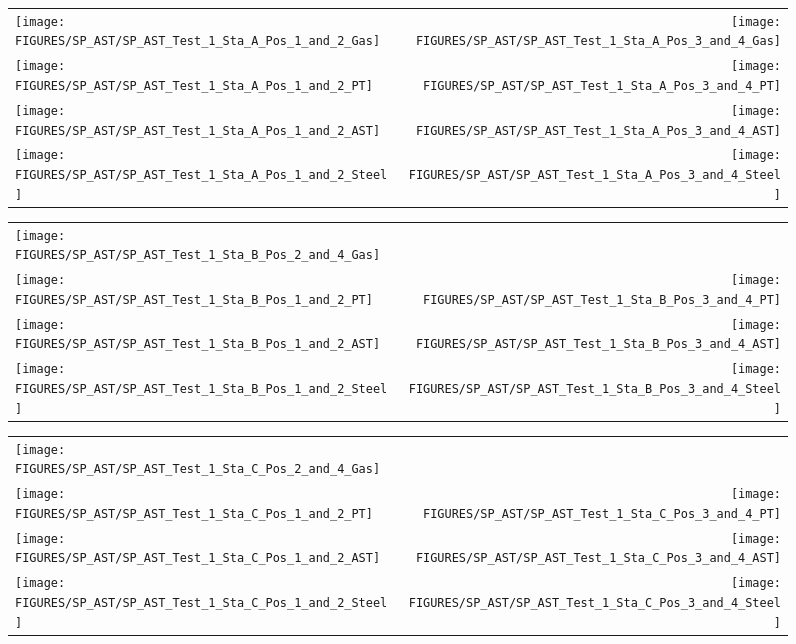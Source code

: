 \newpage


\begin{figure}[p]
\begin{tabular*}{\textwidth}{l@{\extracolsep{\fill}}r}
\texttt{[image: FIGURES/SP\_AST/SP\_AST\_Test\_1\_Sta\_A\_Pos\_1\_and\_2\_Gas]} &
\texttt{[image: FIGURES/SP\_AST/SP\_AST\_Test\_1\_Sta\_A\_Pos\_3\_and\_4\_Gas]} \\
\texttt{[image: FIGURES/SP\_AST/SP\_AST\_Test\_1\_Sta\_A\_Pos\_1\_and\_2\_PT]} &
\texttt{[image: FIGURES/SP\_AST/SP\_AST\_Test\_1\_Sta\_A\_Pos\_3\_and\_4\_PT]} \\
\texttt{[image: FIGURES/SP\_AST/SP\_AST\_Test\_1\_Sta\_A\_Pos\_1\_and\_2\_AST]} &
\texttt{[image: FIGURES/SP\_AST/SP\_AST\_Test\_1\_Sta\_A\_Pos\_3\_and\_4\_AST]} \\
\texttt{[image: FIGURES/SP\_AST/SP\_AST\_Test\_1\_Sta\_A\_Pos\_1\_and\_2\_Steel]} &
\texttt{[image: FIGURES/SP\_AST/SP\_AST\_Test\_1\_Sta\_A\_Pos\_3\_and\_4\_Steel]}
\end{tabular*}
\label{SP_Test_1_Station_A}
\end{figure}

\begin{figure}[p]
\begin{tabular*}{\textwidth}{l@{\extracolsep{\fill}}r}
\texttt{[image: FIGURES/SP\_AST/SP\_AST\_Test\_1\_Sta\_B\_Pos\_2\_and\_4\_Gas]} &
  \\
\texttt{[image: FIGURES/SP\_AST/SP\_AST\_Test\_1\_Sta\_B\_Pos\_1\_and\_2\_PT]} &
\texttt{[image: FIGURES/SP\_AST/SP\_AST\_Test\_1\_Sta\_B\_Pos\_3\_and\_4\_PT]} \\
\texttt{[image: FIGURES/SP\_AST/SP\_AST\_Test\_1\_Sta\_B\_Pos\_1\_and\_2\_AST]} &
\texttt{[image: FIGURES/SP\_AST/SP\_AST\_Test\_1\_Sta\_B\_Pos\_3\_and\_4\_AST]} \\
\texttt{[image: FIGURES/SP\_AST/SP\_AST\_Test\_1\_Sta\_B\_Pos\_1\_and\_2\_Steel]} &
\texttt{[image: FIGURES/SP\_AST/SP\_AST\_Test\_1\_Sta\_B\_Pos\_3\_and\_4\_Steel]}
\end{tabular*}
\label{SP_Test_1_Station_B}
\end{figure}

\begin{figure}[p]
\begin{tabular*}{\textwidth}{l@{\extracolsep{\fill}}r}
\texttt{[image: FIGURES/SP\_AST/SP\_AST\_Test\_1\_Sta\_C\_Pos\_2\_and\_4\_Gas]} &
  \\
\texttt{[image: FIGURES/SP\_AST/SP\_AST\_Test\_1\_Sta\_C\_Pos\_1\_and\_2\_PT]} &
\texttt{[image: FIGURES/SP\_AST/SP\_AST\_Test\_1\_Sta\_C\_Pos\_3\_and\_4\_PT]} \\
\texttt{[image: FIGURES/SP\_AST/SP\_AST\_Test\_1\_Sta\_C\_Pos\_1\_and\_2\_AST]} &
\texttt{[image: FIGURES/SP\_AST/SP\_AST\_Test\_1\_Sta\_C\_Pos\_3\_and\_4\_AST]} \\
\texttt{[image: FIGURES/SP\_AST/SP\_AST\_Test\_1\_Sta\_C\_Pos\_1\_and\_2\_Steel]} &
\texttt{[image: FIGURES/SP\_AST/SP\_AST\_Test\_1\_Sta\_C\_Pos\_3\_and\_4\_Steel]}
\end{tabular*}
\label{SP_Test_1_Station_C}
\end{figure}


